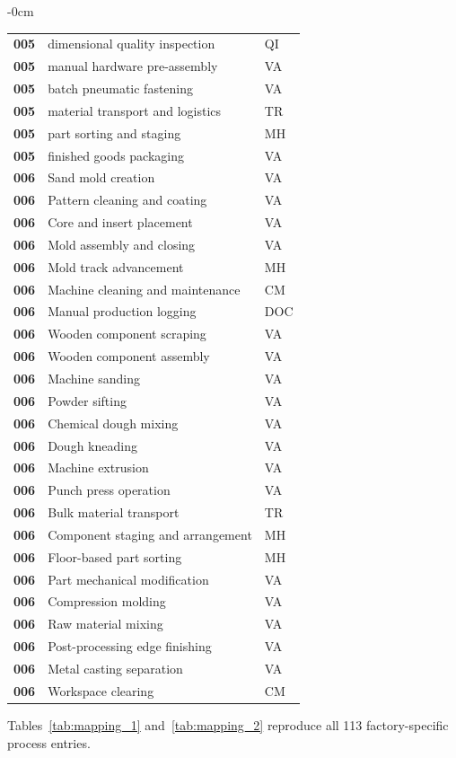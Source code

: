 \begin{table}[!t]
\begin{adjustwidth}{-\extralength}{0cm}
\begin{tabularx}{\linewidth}{@{}l L l@{}}
\textbf{005} & dimensional quality inspection & QI \\
\textbf{005} & manual hardware pre-assembly & VA \\
\textbf{005} & batch pneumatic fastening & VA \\
\textbf{005} & material transport and logistics & TR \\
\textbf{005} & part sorting and staging & MH \\
\textbf{005} & finished goods packaging & VA \\
\textbf{006} & Sand mold creation & VA \\
\textbf{006} & Pattern cleaning and coating & VA \\
\textbf{006} & Core and insert placement & VA \\
\textbf{006} & Mold assembly and closing & VA \\
\textbf{006} & Mold track advancement & MH \\
\textbf{006} & Machine cleaning and maintenance & CM \\
\textbf{006} & Manual production logging & DOC \\
\textbf{006} & Wooden component scraping & VA \\
\textbf{006} & Wooden component assembly & VA \\
\textbf{006} & Machine sanding & VA \\
\textbf{006} & Powder sifting & VA \\
\textbf{006} & Chemical dough mixing & VA \\
\textbf{006} & Dough kneading & VA \\
\textbf{006} & Machine extrusion & VA \\
\textbf{006} & Punch press operation & VA \\
\textbf{006} & Bulk material transport & TR \\
\textbf{006} & Component staging and arrangement & MH \\
\textbf{006} & Floor-based part sorting & MH \\
\textbf{006} & Part mechanical modification & VA \\
\textbf{006} & Compression molding & VA \\
\textbf{006} & Raw material mixing & VA \\
\textbf{006} & Post-processing edge finishing & VA \\
\textbf{006} & Metal casting separation & VA \\
\textbf{006} & Workspace clearing & CM \\
\bottomrule\end{tabularx}\end{adjustwidth}\end{table}
\FloatBarrier
Tables~\ref{tab:mapping_1} and~\ref{tab:mapping_2} reproduce all 113 factory-specific process entries.
